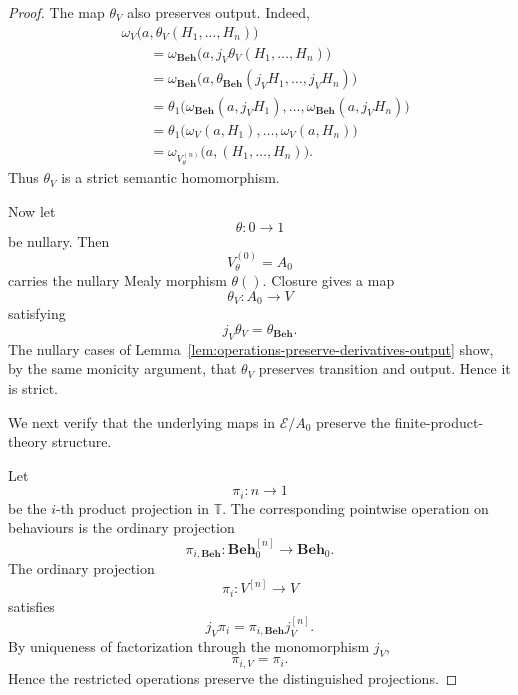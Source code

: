 \begin{proof}
    The map \(\theta_V\) also preserves output. Indeed,
    \[
    \begin{aligned}
        &
        \omega_V
        \bigl(
            a,
            \theta_V(H_1,\dots,H_n)
        \bigr)
        \\
        &\qquad=
        \omega_{\mathbf{Beh}}
        \bigl(
            a,
            j_V\theta_V(H_1,\dots,H_n)
        \bigr)
        \\
        &\qquad=
        \omega_{\mathbf{Beh}}
        \bigl(
            a,
            \theta_{\mathbf{Beh}}
            (j_VH_1,\dots,j_VH_n)
        \bigr)
        \\
        &\qquad=
        \theta_1
        \bigl(
            \omega_{\mathbf{Beh}}(a,j_VH_1),
            \dots,
            \omega_{\mathbf{Beh}}(a,j_VH_n)
        \bigr)
        \\
        &\qquad=
        \theta_1
        \bigl(
            \omega_V(a,H_1),
            \dots,
            \omega_V(a,H_n)
        \bigr)
        \\
        &\qquad=
        \omega_{V^{(n)}_\theta}
        \bigl(
            a,(H_1,\dots,H_n)
        \bigr).
    \end{aligned}
    \]
    Thus \(\theta_V\) is a strict semantic homomorphism.

    Now let
    \[
        \theta:0\to1
    \]
    be nullary. Then
    \[
        V^{(0)}_\theta=A_0
    \]
    carries the nullary Mealy morphism \(\theta()\). Closure gives a map
    \[
        \theta_V:A_0\to V
    \]
    satisfying
    \[
        j_V\theta_V=\theta_{\mathbf{Beh}}.
    \]
    The nullary cases of
    Lemma~\ref{lem:operations-preserve-derivatives-output}
    show, by the same monicity argument, that \(\theta_V\) preserves
    transition and output. Hence it is strict.

    We next verify that the underlying maps in \(\mathcal E/A_0\)
    preserve the finite-product-theory structure.

    Let
    \[
        \pi_i:n\to1
    \]
    be the \(i\)-th product projection in \(\mathbb T\). The corresponding
    pointwise operation on behaviours is the ordinary projection
    \[
        \pi_{i,\mathbf{Beh}}:
        \mathbf{Beh}_0^{[n]}\to\mathbf{Beh}_0.
    \]
    The ordinary projection
    \[
        \pi_i:V^{[n]}\to V
    \]
    satisfies
    \[
        j_V\pi_i
        =
        \pi_{i,\mathbf{Beh}}j_V^{[n]}.
    \]
    By uniqueness of factorization through the monomorphism \(j_V\),
    \[
        \pi_{i,V}=\pi_i.
    \]
    Hence the restricted operations preserve the distinguished projections.


\end{proof}
